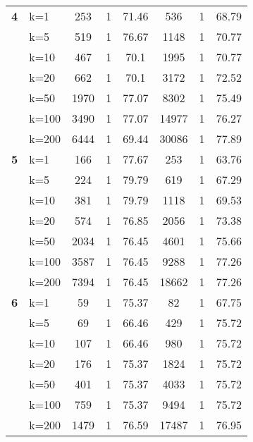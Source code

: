 \begin{table}[htbp]
\begin{tabular}{ll|ccc|ccc}
    \multicolumn{1}{r}{\textbf{4}} & k=1 & 253 & 1 & 71.46 & 536 & 1 & 68.79 \\ 
     & k=5 & 519 & 1 & 76.67 & 1148 & 1 & 70.77 \\ 
     & k=10 & 467 & 1 & 70.1 & 1995 & 1 & 70.77 \\ 
     & k=20 & 662 & 1 & 70.1 & 3172 & 1 & 72.52 \\ 
     & k=50 & 1970 & 1 & 77.07 & 8302 & 1 & 75.49 \\ 
     & k=100 & 3490 & 1 & 77.07 & 14977 & 1 & 76.27 \\ 
     & k=200 & 6444 & 1 & 69.44 & 30086 & 1 & 77.89 \\ \hline
    \multicolumn{1}{r}{\textbf{5}} & k=1 & 166 & 1 & 77.67 & 253 & 1 & 63.76 \\ 
     & k=5 & 224 & 1 & 79.79 & 619 & 1 & 67.29 \\ 
     & k=10 & 381 & 1 & 79.79 & 1118 & 1 & 69.53 \\ 
     & k=20 & 574 & 1 & 76.85 & 2056 & 1 & 73.38 \\ 
     & k=50 & 2034 & 1 & 76.45 & 4601 & 1 & 75.66 \\ 
     & k=100 & 3587 & 1 & 76.45 & 9288 & 1 & 77.26 \\ 
     & k=200 & 7394 & 1 & 76.45 & 18662 & 1 & 77.26 \\ \hline
    \multicolumn{1}{r}{\textbf{6}} & k=1 & 59 & 1 & 75.37 & 82 & 1 & 67.75 \\ 
     & k=5 & 69 & 1 & 66.46 & 429 & 1 & 75.72 \\ 
     & k=10 & 107 & 1 & 66.46 & 980 & 1 & 75.72 \\ 
     & k=20 & 176 & 1 & 75.37 & 1824 & 1 & 75.72 \\ 
     & k=50 & 401 & 1 & 75.37 & 4033 & 1 & 75.72 \\ 
     & k=100 & 759 & 1 & 75.37 & 9494 & 1 & 75.72 \\ 
     & k=200 & 1479 & 1 & 76.59 & 17487 & 1 & 76.95 \\ \hline
    \end{tabular}
    \label{use_case}
    \end{table}
    